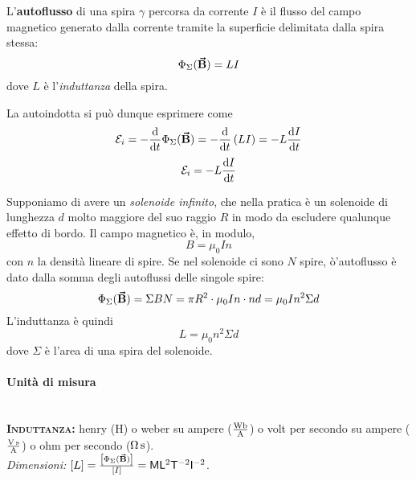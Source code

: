 \begin{define}[Autoflusso]
	L'\textbf{autoflusso} di una spira $\gamma$ percorsa da corrente $I$ è il flusso del campo magnetico generato dalla corrente tramite la superficie delimitata dalla spira stessa:
	\begin{equation}
		\Phi_{\Sigma}(\vb*{\va{B}})=LI
	\end{equation}
	dove $L$ è l'\textit{induttanza} della spira.
\end{define}
La \fem autoindotta si può dunque esprimere come
\begin{equation*}
	\mathcal{E}_i=-\dv{t}\Phi_{\Sigma}(\vb*{\va{B}})=-\dv{t}\left(LI\right)=-L\dv{I}{t}
\end{equation*}
\begin{equation}
	\mathcal{E}_i=-L\dv{I}{t}
\end{equation}
\begin{example}
	Supponiamo di avere un \textit{solenoide infinito}, che nella pratica è un solenoide di lunghezza $d$ molto maggiore del suo raggio $R$ in modo da escludere qualunque effetto di bordo. Il campo magnetico è, in modulo,
	\begin{equation*}
		B=\mu_0 I n
	\end{equation*}
	con $n$ la densità lineare di spire. Se nel solenoide ci sono $N$ spire, ò'autoflusso è dato dalla somma degli autoflussi delle singole spire:
	\begin{equation}
		\Phi_{\Sigma}(\vb*{\va{B}})=\Sigma B N=\pi R^2 \cdot \mu_0 I n \cdot nd=\mu_0 I n^2\Sigma d
	\end{equation}
	L'induttanza è quindi
	\begin{equation}
		L=\mu_0 n^2\Sigma d
	\end{equation}
	dove $\Sigma$ è l'area di una spira del solenoide.
\end{example}
\paragraph{Unità di misura}
\begin{units}~\\
	\textbf{\textsc{Induttanza:}} henry ($\unit{\henry}$) o weber su ampere  ($\unit[per-mode = fraction]{\weber\per\ampere}$) o volt per secondo su ampere ($\unit[per-mode = fraction]{\volt\second\per\ampere}$) o ohm per secondo ($\unit[per-mode = fraction]{\ohm\second}$).\\
	\textit{Dimensioni:} $[L]=\frac{\left[\Phi_{\Sigma}(\vb*{\va{B}})\right]}{\left[I\right]}=\mathsf{M} \mathsf{L}^2 \mathsf{T}^{-2} \mathsf{I}^{-2}$.
\end{units}
